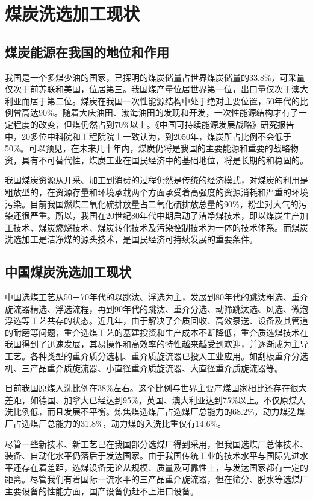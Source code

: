 \documentclass[10pt,openany]{ctexbook}
\begin{document}
\section{煤炭洗选加工现状}
\subsection{煤炭能源在我国的地位和作用}
我国是一个多煤少油的国家，已探明的煤炭储量占世界煤炭储量的33.8\%，可采量仅次于前苏联和美国，位居第三。我国煤产量位居世界第一位，出口量仅次于澳大利亚而居于第二位。煤炭在我国一次性能源结构中处于绝对主要位置，50年代的比例曾高达90\%。随着大庆油田、渤海油田的发现和开发，一次性能源结构才有了一定程度的改变，但煤仍然占到70\%以上。《中国可持续能源发展战略》研究报告中，20多位中科院和工程院院士一致认为，到2050年，煤炭所占比例不会低于50\%。可以预见，在未来几十年内，煤炭仍将是我国的主要能源和重要的战略物资，具有不可替代性，煤炭工业在国民经济中的基础地位，将是长期的和稳固的。 \par
    我国煤炭资源从开采、加工到消费的过程仍然是传统的经济模式，对煤炭的利用是粗放型的，在资源存量和环境承载两个方面承受着高强度的资源消耗和严重的环境污染。目前我国燃煤二氧化硫排放量占二氧化硫排放总量的90\%，粉尘对大气的污染还很严重。所以，我国在20世纪80年代中期启动了洁净煤技术，即以煤炭生产加工技术、煤炭燃烧技术、煤炭转化技术及污染控制技术为一体的技术体系。而煤炭洗选加工是洁净煤的源头技术，是国民经济可持续发展的重要条件。

\subsection{中国煤炭洗选加工现状}
中国选煤工艺从50－70年代的以跳汰、浮选为主，发展到80年代的跳汰粗选、重介旋流器精选、浮选流程，再到90年代的跳汰、重介分选、动筛跳汰选、风选、微泡浮选等工艺共存的状态。近几年，由于解决了介质回收、高效泵送、设备及其管道的耐磨等问题，重介选煤工艺的基建投资和生产成本不断降低，重介质选煤技术在我国得到了迅速发展，其易操作和高效率的特性越来越受到欢迎，并逐渐成为主导工艺。各种类型的重介质分选机、重介质旋流器已投入工业应用。如刮板重介分选机、三产品重介质旋流器、小直径重介质旋流器、大直径重介质旋流器等。\par
目前我国原煤入洗比例在38\%左右。这个比例与世界主要产煤国家相比还存在很大差距，如德国、加拿大已经达到95\%，英国、澳大利亚达到75\%以上。不仅原煤入洗比例低，而且发展不平衡。炼焦煤选煤厂占选煤厂总能力的68.2\%，动力煤选煤厂占选煤厂总能力的31.8\%，动力煤的入洗比重仅有14.6\%。\par
    尽管一些新技术、新工艺已在我国部分选煤厂得到采用，但我国选煤厂总体技术、装备、自动化水平仍落后于发达国家。由于我国传统工业的技术水平与国际先进水平还存在着差距，选煤设备无论从规模、质量及可靠性上，与发达国家都有一定的距离。尽管我们有着国际一流水平的三产品重介旋流器，但在筛分、脱水等选煤厂主要设备的性能方面，国产设备仍赶不上进口设备。
\end{document}
